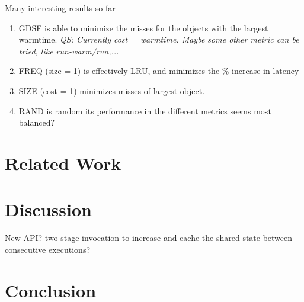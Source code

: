 Many interesting results so far

\begin{enumerate}
\item GDSF is able to minimize the misses for the objects with the largest warmtime. \emph{QS: Currently cost==warmtime.  Maybe some other metric can be tried, like run-warm/run,...}
\item FREQ (size = 1) is effectively LRU, and minimizes the \% increase in latency
\item SIZE (cost = 1) minimizes misses of largest object.
  \item RAND is random its performance in the different metrics seems most balanced? 
\end{enumerate}



\section{Related Work}



\section{Discussion}

New API? two stage invocation to increase and cache the shared state between consecutive executions? 

\section{Conclusion}





